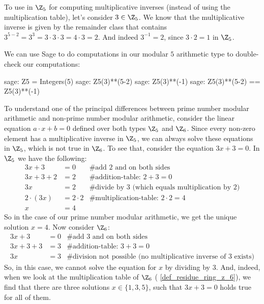 \begin{example} 
To use  in $\Z_5$ for computing multiplicative inverses (instead of using the multiplication table), let's consider $3\in\Z_5$. We know that the multiplicative inverse is given by the remainder class that contains $3^{5-2}=3^3=3\cdot 3\cdot 3= 4\cdot 3 = 2$. And indeed $3^{-1}=2$, since $3\cdot 2 =1$ in $\Z_5$.

We can use  Sage to do computations in our modular $5$ arithmetic type to double-check our computations:
\begin{sagecommandline}
sage: Z5 = Integers(5)
sage: Z5(3)**(5-2)
sage: Z5(3)**(-1)
sage: Z5(3)**(5-2) == Z5(3)**(-1)
\end{sagecommandline}
\end{example}
\begin{example}
To understand one of the principal differences between prime number modular arithmetic and non-prime number modular arithmetic, consider the linear equation $a\cdot x +b=0$ defined over both types $\Z_5$ and $\Z_6$. Since every non-zero element has a multiplicative inverse in $\Z_5$, we can always solve these equations in $\Z_5$, which is not true in $\Z_6$. To see that, consider the equation $3x+3=0$. In $\Z_5$ we have the following:
\begin{align*}
3x+3    &= 0 & \text{\# add 2 and on both sides} \\
3x+3+2  &= 2 & \text{\# addition-table: } 2+3 = 0 \\
3x      &= 2 & \text{\# divide by } 3  \text{ (which equals multiplication by 2)}\\
2\cdot(3x)      &= 2\cdot 2 & \text{\# multiplication-table: } 2\cdot 2=4 \\
 x      &= 4 &
\end{align*}
So in the case of our prime number modular arithmetic, we get the unique solution $x=4$. Now consider $\Z_6$:
\begin{align*}
3x+3    &= 0 & \text{\# add 3 and on both sides} \\
3x+3+3  &= 3 & \text{\# addition-table: } 3+3 = 0 \\
3x      &= 3 & \text{\# division not possible (no multiplicative inverse of 3  exists)}
\end{align*}
So, in this case, we cannot solve the equation for $x$ by dividing by $3$. And, indeed, when we look at the multiplication table of $\Z_6$ (\examplename{} \ref{def_residue_ring_z_6}), we find that there are three solutions $x\in\{1,3,5\}$, such that $3x+3=0$ holds true for all of them.
\end{example}
